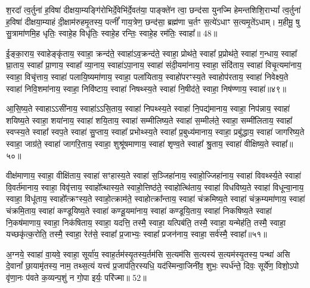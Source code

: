श॒रदा᳚ त्व॒र्तुना॑ ह॒विषा॑ दीक्षया॒म्यङ्गि॑रोभिर्दे॒वेभि॑र्दे॒वत॑या॒ पाङ्क्ते॑न त्वा॒ छन्द॑सा युनज्मि हेमन्तशिशि॒रा\-भ्यां᳚ त्व॒र्तुना॑ ह॒विषा॑ दीक्षया॒म्याहं दी॒क्षाम॑रुहमृ॒तस्य॒ पत्नीं᳚ गाय॒त्रेण॒ छन्द॑सा॒ ब्रह्म॑णा च॒र्तꣳ स॒त्ये॑\-ऽधाꣳ स॒त्यमृ॒ते॑\-ऽधाम्। म॒हीमू॒ षु सु॒त्रामा॑णमि॒ह धृतिः॒ स्वाहे॒ह विधृ॑तिः॒ स्वाहे॒ह रन्तिः॒ स्वाहे॒ह रम॑तिः॒ स्वाहा᳚॥ 48॥

{\anuvakamend[{}]}

ई॒ङ्का॒राय॒ स्वाहेङ्कृ॑ताय॒ स्वाहा॒ क्रन्द॑ते॒ स्वाहा॑\-ऽव॒क्रन्द॑ते॒ स्वाहा॒ प्रोथ॑ते॒ स्वाहा᳚ प्र॒प्रोथ॑ते॒ स्वाहा॑ ग॒न्धाय॒ स्वाहा᳚ घ्रा॒ताय॒ स्वाहा᳚ प्रा॒णाय॒ स्वाहा᳚ व्या॒नाय॒ स्वाहा॑\-ऽपा॒नाय॒ स्वाहा॑ संदी॒यमा॑नाय॒ स्वाहा॒ संदि॑ताय॒ स्वाहा॑ विचृ॒त्यमा॑नाय॒ स्वाहा॒ विचृ॑त्ताय॒ स्वाहा॑ पलायि॒ष्यमा॑णाय॒ स्वाहा॒ पला॑यिताय॒ स्वाहो॑परꣳस्य॒ते स्वाहोप॑रताय॒ स्वाहा॑ निवेक्ष्य॒ते स्वाहा॑ निवि॒शमा॑नाय॒ स्वाहा॒ निवि॑ष्टाय॒ स्वाहा॑ निषथ्स्य॒ते स्वाहा॑ नि॒षीद॑ते॒ स्वाहा॒ निष॑ण्णाय॒ स्वाहा॑॥४९॥

आ॒सि॒ष्य॒ते स्वाहा\-ऽ\-ऽसी॑नाय॒ स्वाहा॑\-ऽ\-ऽसि॒ताय॒ स्वाहा॑ निपथ्स्य॒ते स्वाहा॑ नि॒पद्य॑मानाय॒ स्वाहा॒ निप॑न्नाय॒ स्वाहा॑ शयिष्य॒ते स्वाहा॒ शया॑नाय॒ स्वाहा॑ शयि॒ताय॒ स्वाहा॑ सम्मीलिष्य॒ते स्वाहा॑ स॒म्मील॑ते॒ स्वाहा॒ सम्मी॑लिताय॒ स्वाहा᳚ स्वप्स्य॒ते स्वाहा᳚ स्वप॒ते स्वाहा॑ सु॒प्ताय॒ स्वाहा᳚ प्रभोथ्स्य॒ते स्वाहा᳚ प्र॒बुध्य॑मानाय॒ स्वाहा॒ प्रबु॑द्धाय॒ स्वाहा॑ जागरिष्य॒ते स्वाहा॒ जाग्र॑ते॒ स्वाहा॑ जागरि॒ताय॒ स्वाहा॒ शुश्रू॑षमाणाय॒ स्वाहा॑ शृण्व॒ते स्वाहा᳚ श्रु॒ताय॒ स्वाहा॑ वीक्षिष्य॒ते स्वाहा᳚॥५०॥

वीक्ष॑माणाय॒ स्वाहा॒ वीक्षि॑ताय॒ स्वाहा॑ सꣳहास्य॒ते स्वाहा॑ स॒ञ्जिहा॑नाय॒ स्वाहो॒ज्जिहा॑नाय॒ स्वाहा॑ विवर्थ्स्य॒ते स्वाहा॑ वि॒वर्त॑मानाय॒ स्वाहा॒ विवृ॑त्ताय॒ स्वाहो᳚त्थास्य॒ते स्वाहो॒त्तिष्ठ॑ते॒ स्वाहोत्थि॑ताय॒ स्वाहा॑ विधविष्य॒ते स्वाहा॑ विधून्वा॒नाय॒ स्वाहा॒ विधू॑ताय॒ स्वाहो᳚त्क्रꣳस्य॒ते स्वाहो॒त्क्राम॑ते॒ स्वाहोत्क्रा᳚न्ताय॒ स्वाहा॑ चंक्रमिष्य॒ते स्वाहा॑ चंक्र॒म्यमा॑णाय॒ स्वाहा॑ चंक्रमि॒ताय॒ स्वाहा॑ कण्डूयिष्य॒ते स्वाहा॑ कण्डू॒यमा॑नाय॒ स्वाहा॑ कण्डूयि॒ताय॒ स्वाहा॑ निकषिष्य॒ते स्वाहा॑ नि॒कष॑माणाय॒ स्वाहा॒ निक॑षिताय॒ स्वाहा॒ यदत्ति॒ तस्मै॒ स्वाहा॒ यत्पिब॑ति॒ तस्मै॒ स्वाहा॒ यन्मेह॑ति॒ तस्मै॒ स्वाहा॒ यच्छकृ॑त्क॒रोति॒ तस्मै॒ स्वाहा॒ रेत॑से॒ स्वाहा᳚ प्र॒जाभ्यः॒ स्वाहा᳚ प्रजन॑नाय॒ स्वाहा॒ सर्व॑स्मै॒ स्वाहा᳚॥५१॥

{\anuvakamend[{}]}

अ॒ग्नये॒ स्वाहा॑ वा॒यवे॒ स्वाहा॒ सूर्या॑य॒ स्वाह॒र्तम॑स्यृ॒तस्य॒र्तम॑सि स॒त्यम॑सि स॒त्यस्य॑ स॒त्यम॑स्यृ॒तस्य॒ पन्था॑ असि दे॒वानां᳚ छा॒यामृ॑तस्य॒ नाम॒ तथ्स॒त्यं यत्त्वं प्र॒जाप॑ति॒रस्यधि॒ यद॑स्मिन्वा॒जिनी॑व॒ शुभः॒ स्पर्ध॑न्ते॒ दिवः॒ सूर्ये॑ण॒ विशो॒\-ऽपो वृ॑णा॒नः प॑वते क॒व्यन्प॒शुं न गो॒पा इर्यः॒ परि॑ज्मा॥ 52॥


